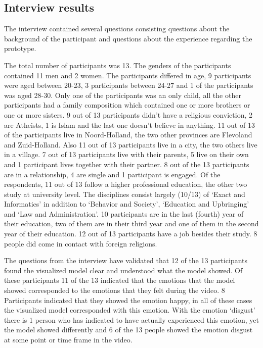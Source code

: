 \documentclass[sigconf]{acmart}
\begin{document}
\subsection{Interview results}
The interview contained several questions consisting questions about the background of the participant and
questions about the experience regarding the prototype.

The total number of participants was 13. The genders of the participants contained 11 men and 2 women.
The participants differed in age, 9 participants were aged between 20-23, 3 participants between 24-27 and 1
of the participants was aged 28-30. Only one of the participants was an only child, all the other participants
had a family composition which contained one or more brothers or one or more sisters. 9 out of 13
participants didn't have a religious conviction, 2 are Atheists, 1 is Islam and the last one doesn't believe
in anything. 11 out of 13 of the participants live in Noord-Holland, the two other provinces are Flevoland and
Zuid-Holland. Also 11 out of 13 participants live in a city, the two others live in a village. 7 out of 13
participants live with their parents, 5 live on their own and 1 participant lives together with their partner.
8 out of the 13 participants are in a relationship, 4 are single and 1 participant is engaged.
Of the respondents, 11 out of 13 follow a higher professional education, the other two study at university level.
The disciplines consist largely (10/13) of ‘Exact and Informatics’ in addition to ‘Behavior and Society’,
‘Education and Upbringing’ and ‘Law and Administration’. 10 participants are in the last (fourth) year of their
education, two of them are in their third year and one of them in the second year of their education.
12 out of 13 participants have a job besides their study. 8 people did come in contact with foreign religions.

The questions from the interview have validated that 12 of the 13 participants found the visualized model clear
and understood what the model showed. Of these participants 11 of the 13 indicated that the emotions that the
model showed corresponded to the emotions that they felt during the video. 8 Participants indicated that they
showed the emotion happy, in all of these cases the visualized model corresponded with this emotion.
With the emotion ‘disgust’ there is 1 person who has indicated to have actually experienced this emotion,
yet the model showed differently and 6 of the 13 people showed the emotion disgust at some point or time frame
in the video.
\end{document}
